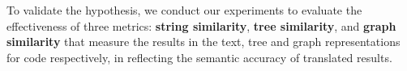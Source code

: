 %
%
To validate the hypothesis, we conduct our experiments to evaluate the
effectiveness of three metrics: \textbf{string similarity},
\textbf{tree similarity}, and \textbf{graph similarity} that measure
the results in the text, tree and graph representations for code
respectively, in reflecting the semantic accuracy of translated
results.


 

